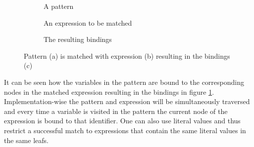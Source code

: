 \begin{figure}[H]
  \centering
  \begin{subfigure}[t]{0.33\textwidth}
    \centering
    \caption{A pattern}
  \end{subfigure}
  \begin{subfigure}[t]{0.32\textwidth}
    \centering
    \caption{An expression to be matched}
  \end{subfigure}
  \begin{subfigure}[t]{0.33\textwidth}
    \centering
    \caption{The resulting bindings}
    \label{subfig:pat-binding}
  \end{subfigure}
  \caption{Pattern (a) is matched with expression (b) resulting in the bindings (c)}
  \label{fig:pattern-match}
\end{figure}

It can be seen how the variables in the pattern are bound to the corresponding nodes in the matched expression resulting in the bindings in figure \ref{subfig:pat-binding}. Implementation-wise the pattern and expression will be simultaneously traversed and every time a variable is visited in the pattern the current node of the expression is bound to that identifier. One can also use literal values and thus restrict a successful match to expressions that contain the same literal values in the same leafs.

